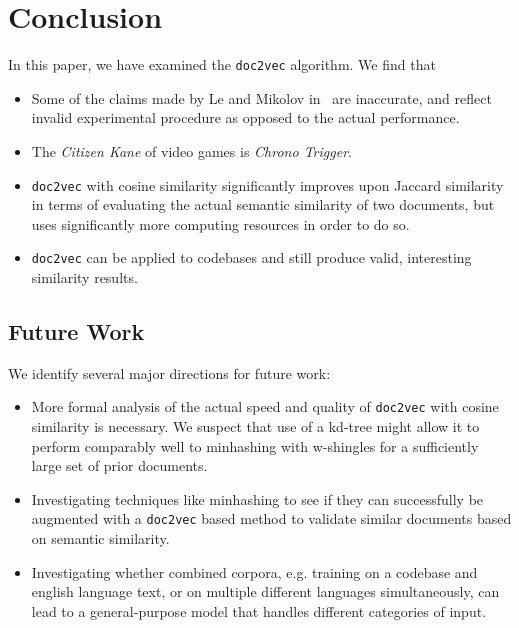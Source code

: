 \documentclass[11pt]{article}
\begin{document}
\section*{Conclusion}
In this paper, we have examined the \texttt{doc2vec} algorithm.
We find that
\begin{itemize}
  \item Some of the claims made by Le and Mikolov
        in~\cite{le2014distributed} are inaccurate, and reflect invalid
        experimental procedure as opposed to the actual performance.
  \item The \emph{Citizen Kane} of video games is \emph{Chrono Trigger}.
  \item \texttt{doc2vec} with cosine similarity significantly improves
        upon Jaccard similarity in terms of evaluating the actual semantic
        similarity of two documents, but uses significantly more computing
        resources in order to do so.
  \item \texttt{doc2vec} can be applied to codebases and still produce valid,
        interesting similarity results.
\end{itemize}

\subsection*{Future Work}
We identify several major directions for future work:
\begin{itemize}
  \item More formal analysis of the actual speed and quality of
        \texttt{doc2vec} with cosine similarity is necessary. We suspect
        that use of a kd-tree might allow it to perform comparably well
        to minhashing with w-shingles for a sufficiently large set of prior
        documents.
  \item Investigating techniques like minhashing to see if they can
        successfully be augmented with a \texttt{doc2vec} based method to
        validate similar documents based on semantic similarity.
  \item Investigating whether combined corpora, e.g. training on a codebase
        and english language text, or on multiple different languages
        simultaneously, can lead to a general-purpose model that handles
        different categories of input.
\end{itemize}

\printbibliography
\end{document}
